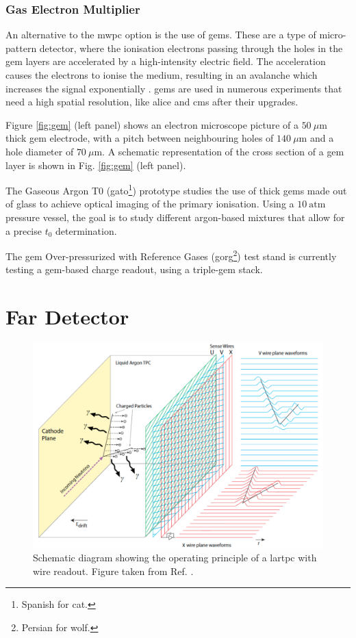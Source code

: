 \subsubsection{Gas Electron Multiplier}

An alternative to the \gls{mwpc} option is the use of \gls{gem}s. These are a type of micro-pattern detector, where the ionisation electrons passing through the holes in the \gls{gem} layers are accelerated by a high-intensity electric field. The acceleration causes the electrons to ionise the medium, resulting in an avalanche which increases the signal exponentially \cite{Sauli1997}. \gls{gem}s are used in numerous experiments that need a high spatial resolution, like \gls{alice} \cite{Lippmann2016} and \gls{cms} \cite{Calabria2016} after their upgrades.

Figure \ref{fig:gem} (left panel) shows an electron microscope picture of a $50~\mu\mathrm{m}$ thick \gls{gem} electrode, with a pitch between neighbouring holes of $140~\mu\mathrm{m}$ and a hole diameter of $70~\mu\mathrm{m}$. A schematic representation of the cross section of a \gls{gem} layer is shown in Fig. \ref{fig:gem} (left panel).

The Gaseous Argon T0 (\gls{gato}\footnote{Spanish for cat.}) prototype studies the use of thick \gls{gem}s made out of glass to achieve optical imaging of the primary ionisation. Using a $10~\mathrm{atm}$ pressure vessel, the goal is to study different argon-based mixtures that allow for a precise $t_{0}$ determination.

The \gls{gem} Over-pressurized with Reference Gases (\gls{gorg}\footnote{Persian for wolf.}) test stand is currently testing a \gls{gem}-based charge readout, using a triple-\gls{gem} stack.

\section{Far Detector}

\begin{figure}[t]
	\centering
	\includegraphics[width=0.8\linewidth]{Images/DUNE/FD/tpc}
	\caption[Schematic diagram showing the operating principle of a \gls{lartpc} with wire readout.]{Schematic diagram showing the operating principle of a \gls{lartpc} with wire readout. Figure taken from Ref. \cite{DUNE2020TDR1}.}
	\label{fig:lartpc}
\end{figure}

